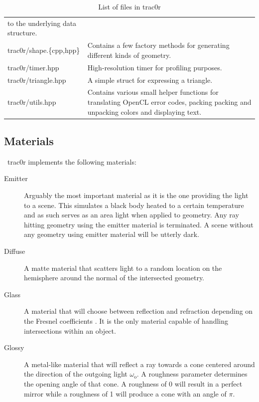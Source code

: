 \documentclass[
  twoside,
  11pt, a4paper,
  footinclude=true,
  headinclude=true,
  cleardoublepage=empty
]{scrreprt}
\begin{document}
\begin{table}[H]
\begin{tabularx}{\textwidth}{l | X}
                                     to the underlying data structure. \\
        trac0r/shape.\{cpp,hpp\}     & Contains a few factory methods for generating different kinds
                                     of geometry.\\
        trac0r/timer.hpp           & High-resolution timer for profiling purposes. \\
        trac0r/triangle.hpp        & A simple struct for expressing a
                                     triangle. \\
        trac0r/utils.hpp           & Contains various small helper functions for translating OpenCL
                                     error codes, packing packing and unpacking colors and
                                     displaying text.
    \end{tabularx}
    \caption{List of files in trac0r}
\end{table}

\subsection{Materials}
\
trac0r implements the following materials:
\begin{description}
    \item[Emitter] Arguably the most important material as it is the one providing the light to a
        scene. This simulates a black body heated to a certain temperature and as such serves as an
        area light when applied to geometry. Any ray hitting geometry using the emitter material is
        terminated. A scene without any geometry using emitter material will be utterly dark.
    \item[Diffuse] A matte material that scatters light to a random location on the hemisphere
        around the normal of the intersected geometry.
    \item[Glass] A material that will choose between reflection and refraction depending on the
        Fresnel coefficients \cite{wiki:fresnel}. It is the only material capable of handling
        intersections within an object.
    \item[Glossy] A metal-like material that will reflect a ray towards a cone centered around the
        direction of the outgoing light \(\omega_\text{o}\). A roughness parameter determines 
        the opening angle of that cone. A roughness of 0 will result in a perfect mirror while a roughness
        of 1 will produce a cone with an angle of \(\pi\).
\end{description}
\end{document}
